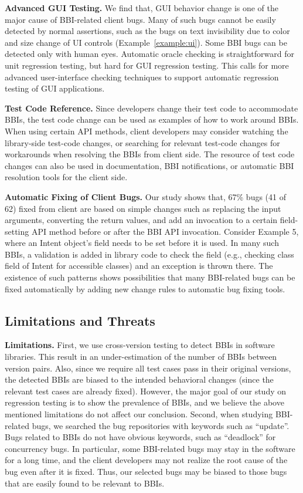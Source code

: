\textbf{Advanced GUI Testing.} We find that, GUI behavior change is one of the major cause of BBI-related client bugs. Many of such bugs cannot be easily detected by normal assertions, such as the bugs on text invisibility due to color and size change of UI controls (Example~\ref{example:ui}). Some BBI bugs can be detected only with human eyes. Automatic oracle checking is straightforward for unit regression testing, but hard for GUI regression testing. This calls for more advanced user-interface checking techniques to support automatic regression testing of GUI applications. 

\textbf{Test Code Reference.} Since developers change their test code to accommodate BBIs, the test code change can be used as examples of how to work around BBIs. When using certain API methods, client developers may consider watching the library-side test-code changes, or searching for relevant test-code changes for workarounds when resolving the BBIs from client side. The resource of test code changes can also be used in documentation, BBI notifications, or automatic BBI resolution tools for the client side. 

\textbf{Automatic Fixing of Client Bugs.} Our study shows that, 67\% bugs (41 of 62) fixed from client are based on simple changes such as replacing the input arguments, converting the return values, and add an invocation to a certain field-setting API method before or after the BBI API invocation. Consider Example 5, where an Intent object's field needs to be set before it is used. In many such BBIs, a validation is added in library code to check the field (e.g., checking class field of Intent for accessible classes) and an exception is thrown there. The existence of such patterns shows possibilities that many BBI-related bugs can be fixed automatically by adding new change rules to automatic bug fixing tools.
\vspace{-3ex}
\subsection{Limitations and Threats}
\label{subsec:limit}
\textbf{Limitations.} First, we use cross-version testing to detect BBIs in software libraries. This result in an under-estimation of the number of BBIs between version pairs. Also, since we require all test cases pass in their original versions, the detected BBIs are biased to the intended behavioral changes (since the relevant test cases are already fixed). However, the major goal of our study on regression testing is to show the prevalence of BBIs, and we believe the above mentioned limitations do not affect our conclusion. Second, when studying BBI-related bugs, we searched the bug repositories with keywords such as ``update''. Bugs related to BBIs do not have obvious keywords, such as ``deadlock'' for concurrency bugs. In particular, some BBI-related bugs may stay in the software for a long time, and the client developers may not realize the root cause of the bug even after it is fixed. Thus, our selected bugs may be biased to those bugs that are easily found to be relevant to BBIs. 


